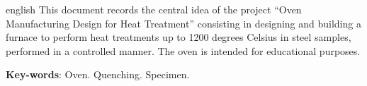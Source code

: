 \begin{resumo}[Abstract]
 \begin{otherlanguage*}{english}
   This document records the central idea of the project “Oven Manufacturing Design for Heat Treatment” consisting in designing and building a furnace to perform heat treatments up to 1200 degrees Celsius in steel samples, performed in a controlled manner. The oven is intended for educational purposes.

   \vspace{\onelineskip}

   \noindent
   \textbf{Key-words}: Oven. Quenching. Specimen.
 \end{otherlanguage*}
\end{resumo}
